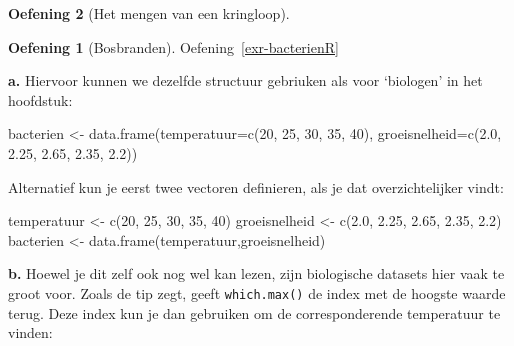 \documentclass[
  a4paper,
]{scrbook}
\newenvironment{Shaded}{\begin{snugshade}}{\end{snugshade}}
\newcommand{\AttributeTok}[1]{\textcolor[rgb]{0.40,0.45,0.13}{#1}}
\newcommand{\CommentTok}[1]{\textcolor[rgb]{0.37,0.37,0.37}{#1}}
\newcommand{\DecValTok}[1]{\textcolor[rgb]{0.68,0.00,0.00}{#1}}
\newcommand{\FloatTok}[1]{\textcolor[rgb]{0.68,0.00,0.00}{#1}}
\newcommand{\FunctionTok}[1]{\textcolor[rgb]{0.28,0.35,0.67}{#1}}
\newcommand{\NormalTok}[1]{\textcolor[rgb]{0.00,0.23,0.31}{#1}}
\newcommand{\OtherTok}[1]{\textcolor[rgb]{0.00,0.23,0.31}{#1}}
\newcommand{\SpecialCharTok}[1]{\textcolor[rgb]{0.37,0.37,0.37}{#1}}
\theoremstyle{definition}
\newtheorem{exercise}{Oefening}[chapter]
\theoremstyle{remark}
\begin{document}
\begin{exercise}[Het mengen van een
kringloop]
\begin{exercise}[Bosbranden]
Oefening~\ref{exr-bacterienR}

\textbf{a.} Hiervoor kunnen we dezelfde structuur gebriuken als voor
`biologen' in het hoofdstuk:

\begin{Shaded}
\begin{Highlighting}[]
\NormalTok{bacterien }\OtherTok{\textless{}{-}} \FunctionTok{data.frame}\NormalTok{(}\AttributeTok{temperatuur=}\FunctionTok{c}\NormalTok{(}\DecValTok{20}\NormalTok{, }\DecValTok{25}\NormalTok{, }\DecValTok{30}\NormalTok{, }\DecValTok{35}\NormalTok{, }\DecValTok{40}\NormalTok{),}
                       \AttributeTok{groeisnelheid=}\FunctionTok{c}\NormalTok{(}\FloatTok{2.0}\NormalTok{, }\FloatTok{2.25}\NormalTok{, }\FloatTok{2.65}\NormalTok{, }\FloatTok{2.35}\NormalTok{, }\FloatTok{2.2}\NormalTok{))}
\end{Highlighting}
\end{Shaded}

Alternatief kun je eerst twee vectoren definieren, als je dat
overzichtelijker vindt:

\begin{Shaded}
\begin{Highlighting}[]
\NormalTok{temperatuur }\OtherTok{\textless{}{-}} \FunctionTok{c}\NormalTok{(}\DecValTok{20}\NormalTok{, }\DecValTok{25}\NormalTok{, }\DecValTok{30}\NormalTok{, }\DecValTok{35}\NormalTok{, }\DecValTok{40}\NormalTok{)}
\NormalTok{groeisnelheid }\OtherTok{\textless{}{-}} \FunctionTok{c}\NormalTok{(}\FloatTok{2.0}\NormalTok{, }\FloatTok{2.25}\NormalTok{, }\FloatTok{2.65}\NormalTok{, }\FloatTok{2.35}\NormalTok{, }\FloatTok{2.2}\NormalTok{)}
\NormalTok{bacterien }\OtherTok{\textless{}{-}} \FunctionTok{data.frame}\NormalTok{(temperatuur,groeisnelheid)}
\end{Highlighting}
\end{Shaded}

\textbf{b.} Hoewel je dit zelf ook nog wel kan lezen, zijn biologische
datasets hier vaak te groot voor. Zoals de tip zegt, geeft
\texttt{which.max()} de index met de hoogste waarde terug. Deze index
kun je dan gebruiken om de corresponderende temperatuur te vinden:

\begin{Shaded}
\end{Shaded}


\end{exercise}
\end{exercise}
\end{document}
